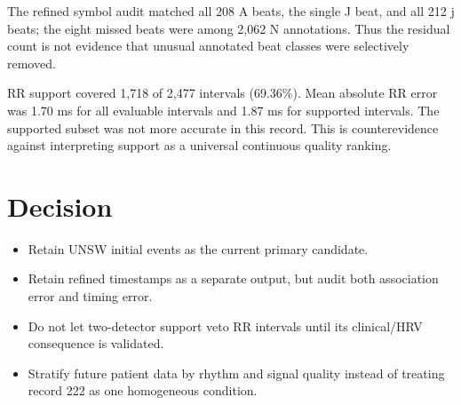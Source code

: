 \documentclass[10pt]{article}
\begin{document}
The refined symbol audit matched all 208 A beats, the single J beat, and all 212 j beats; the eight missed beats were among 2,062 N annotations. Thus the residual count is not evidence that unusual annotated beat classes were selectively removed.

RR support covered 1,718 of 2,477 intervals (69.36\%). Mean absolute RR error was 1.70 ms for all evaluable intervals and 1.87 ms for supported intervals. The supported subset was not more accurate in this record. This is counterevidence against interpreting support as a universal continuous quality ranking.


\section{Decision}
\begin{itemize}
\item Retain UNSW initial events as the current primary candidate.
\item Retain refined timestamps as a separate output, but audit both association error and timing error.
\item Do not let two-detector support veto RR intervals until its clinical/HRV consequence is validated.
\item Stratify future patient data by rhythm and signal quality instead of treating record 222 as one homogeneous condition.
\end{itemize}

\begingroup{}


\endgroup
\end{document}
